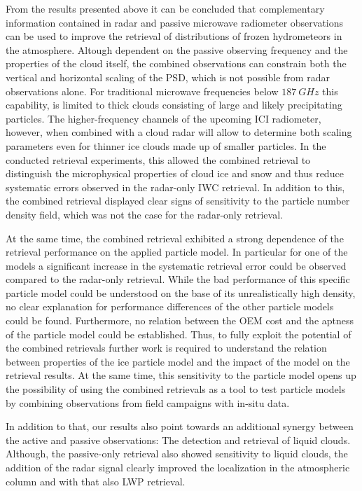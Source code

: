\documentclass[journal abbreviation, manuscript]{copernicus}
\begin{document}
\conclusions  %
\label{sec:conclusions}

From the results presented above it can be concluded that complementary
information contained in radar and passive microwave radiometer observations can
be used to improve the retrieval of distributions of frozen hydrometeors in the
atmosphere. Altough dependent on the passive observing frequency and the
properties of the cloud itself, the combined observations can constrain both the
vertical and horizontal scaling of the PSD, which is not possible from radar
observations alone. For traditional microwave frequencies below $187
\ \unit{GHz}$ this capability, is limited to thick clouds consisting of large
and likely precipitating particles. The higher-frequency channels of the
upcoming ICI radiometer, however, when combined with a cloud radar will allow to
determine both scaling parameters even for thinner ice clouds made up of smaller
particles. In the conducted retrieval experiments, this allowed the combined
retrieval to distinguish the microphysical properties of cloud ice and snow and
thus reduce systematic errors observed in the radar-only IWC retrieval. In
addition to this, the combined retrieval displayed clear signs of sensitivity to
the particle number density field, which was not the case for the radar-only
retrieval.

At the same time, the combined retrieval exhibited a strong dependence of the
retrieval performance on the applied particle model. In particular for one of
the models a significant increase in the systematic retrieval error could be
observed compared to the radar-only retrieval. While the bad performance of this
specific particle model could be understood on the base of its unrealistically
high density, no clear explanation for performance differences of the other
particle models could be found. Furthermore, no relation between the OEM cost
and the aptness of the particle model could be established. Thus, to fully
exploit the potential of the combined retrievals further work is required to
understand the relation between properties of the ice particle model and the
impact of the model on the retrieval results. At the same time, this sensitivity
to the particle model opens up the possibility of using the combined retrievals
as a tool to test particle models by combining observations from field campaigns
with in-situ data.

In addition to that, our results also point towards an additional synergy
between the active and passive observations: The detection and retrieval of
liquid clouds. Although, the passive-only retrieval also showed sensitivity to
liquid clouds, the addition of the radar signal clearly improved the
localization in the atmospheric column and with that also LWP retrieval.
\end{document}
